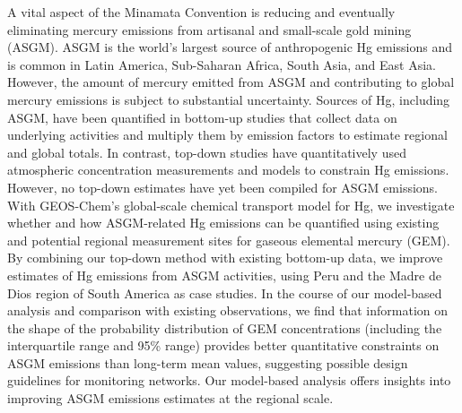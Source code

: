 % 
% 
%
A vital aspect of the Minamata Convention is reducing and eventually eliminating mercury emissions from artisanal and small-scale gold mining (ASGM). ASGM is the world's largest source of anthropogenic Hg emissions and is common in Latin America, Sub-Saharan Africa, South Asia, and East Asia. However, the amount of mercury emitted from ASGM and contributing to global mercury emissions is subject to substantial uncertainty. Sources of Hg, including ASGM, have been quantified in bottom-up studies that collect data on underlying activities and multiply them by emission factors to estimate regional and global totals. In contrast, top-down studies have quantitatively used atmospheric concentration measurements and models to constrain Hg emissions. However, no top-down estimates have yet been compiled for ASGM emissions. With GEOS-Chem's global-scale chemical transport model for Hg, we investigate whether and how ASGM-related Hg emissions can be quantified using existing and potential regional measurement sites for gaseous elemental mercury (GEM). By combining our top-down method with existing bottom-up data, we improve estimates of Hg emissions from ASGM activities, using Peru and the Madre de Dios region of South America as case studies. In the course of our model-based analysis and comparison with existing observations, we find that information on the shape of the probability distribution of GEM concentrations (including the interquartile range and 95\% range) provides better quantitative constraints on ASGM emissions than long-term mean values, suggesting possible design guidelines for monitoring networks. Our model-based analysis offers insights into improving ASGM emissions estimates at the regional scale.